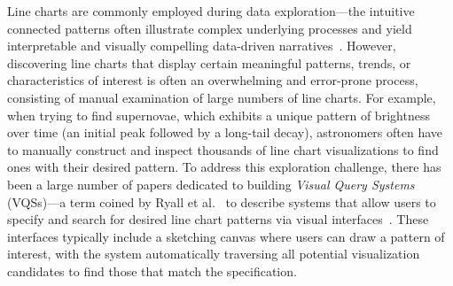  Line charts are commonly employed during data exploration---the intuitive connected patterns often illustrate complex underlying processes and yield interpretable and visually compelling data-driven narratives~\cite{Few2012}. However, discovering line charts that display certain meaningful patterns, trends, or characteristics of interest is often  an overwhelming and error-prone process, consisting of manual examination of large numbers of line charts. For example, when trying to find supernovae, which exhibits a unique pattern of brightness over time (an initial peak followed by a long-tail decay), astronomers often have to manually construct and inspect thousands of line chart visualizations to find ones with their desired pattern. To address this exploration challenge, there has been a large number of papers dedicated to building \emph{Visual Query Systems} (VQSs)---a term coined by Ryall et al.~\cite{ryall2005querylines} to describe systems that allow users to specify and search for desired line chart patterns via visual interfaces~\cite{mohebbi2011google,Hochheiser2004,wattenberg2001sketching,Siddiqui2017VLDB,ryall2005querylines,correll2016semantics,Mannino2018,Eichmann2015,Holz2009}. These interfaces typically include a sketching canvas where users can draw a pattern of interest, with the system automatically traversing all potential visualization candidates to find those that match the specification.  %
